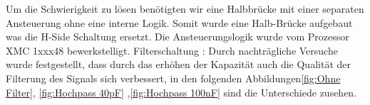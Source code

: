 Um die Schwierigkeit zu lösen benötigten wir eine Halbbrücke mit einer separaten Ansteuerung ohne eine interne Logik. Somit wurde eine Halb-Brücke aufgebaut was die H-Side Schaltung ersetzt. Die Ansteuerungslogik wurde vom Prozessor XMC 1xxx48 bewerkstelligt. 
Filterschaltung :
Durch nachträgliche Versuche wurde festgestellt, dass durch das erhöhen der Kapazität auch die Qualität der Filterung des Signals sich verbessert, in den folgenden Abbildungen\ref{fig:Ohne Filter}, \ref{fig:Hochpass 40pF} ,\ref{fig:Hochpass 100nF} sind die Unterschiede zusehen.